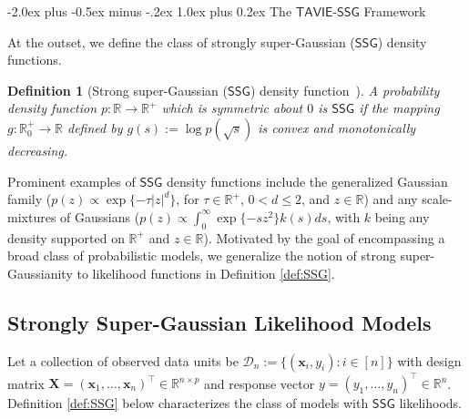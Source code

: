 \documentclass[12pt]{article}
\makeatletter
\def\section{\@startsection{section}{1}{\z@}
  {-2.0ex plus -0.5ex minus -.2ex} %
  {1.0ex plus 0.2ex}               %
  {\normalfont\Large\bfseries}}
\newtheorem{definition}{Definition}[section]
\numberwithin{equation}{section}
\newcommand{\ssg}{\mathsf{SSG}}
\newcommand{\tssg}{\mathsf{TAVIE}\text{-}\mathsf{SSG}}
\makeatother
\begin{document}

\section{The \texorpdfstring{$\tssg$}{TAVIE-SSG} Framework}\label{section:methods}

At the outset, we define the class of {strongly super-Gaussian} ($\ssg$) {density functions}. 

\begin{definition}[Strong super-Gaussian ($\ssg$) density function~\citep{palmer-2005-paper}]
\label{def:SSG-density}
A probability density function $p:\mathbb{R} \to \mathbb{R}^{+}$ which is symmetric about $0$ is $\ssg$ if the mapping $g:\mathbb{R}^{+}_0 \to \mathbb{R}$ defined by $g(s) := \log p(\sqrt{s})$ is convex and monotonically decreasing.
\end{definition}

Prominent examples of $\ssg$ density functions include the {generalized Gaussian} family ($p(z) \propto \exp\{-\tau |{z}|^{d}\}$, for $\tau \in \mathbb{R}^+$, $0 < d \leq 2$, and $z \in \mathbb{R}$) and any {scale-mixtures of Gaussians} ($p(z) \propto \int_{0}^{\infty} \exp\{-sz^2\}k(s)ds$, with $k$ being any density supported on $\mathbb{R}^{+}$ and $z \in \mathbb{R}$). Motivated by the goal of encompassing a broad class of probabilistic models, we generalize the notion of strong super-Gaussianity to likelihood functions in Definition \ref{def:SSG}.


\subsection{Strongly Super-Gaussian Likelihood Models}\label{subsec:SSG-likelihood-models}

Let a collection of observed data units be $\mathcal{D}_n := \{(\mathbf{x}_i, y_i): i\in [n]\}$ with design matrix $\mathbf{X} = (\mathbf{x}_1, \ldots, \mathbf{x}_n)^{\top} \in \mathbb{R}^{n \times p}$ and response vector $y = (y_1, \ldots, y_n)^{\top} \in \mathbb{R}^n$. Definition \ref{def:SSG} below characterizes the class of models with $\ssg$ likelihoods.
\end{document}
